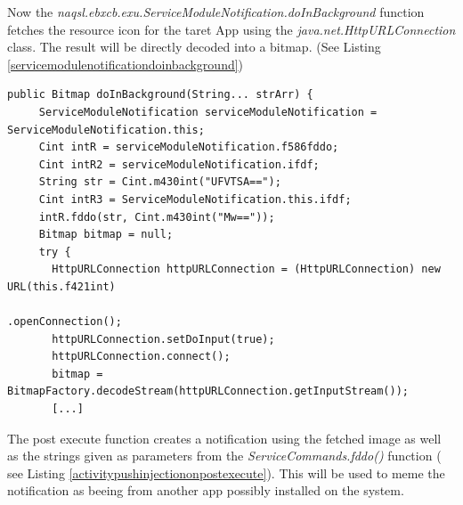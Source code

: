 \documentclass[10pt,titlepage]{article}
\begin{document}
Now the \textit{naqsl.ebxcb.exu.ServiceModuleNotification.doInBackground}
function fetches the resource icon for the taret App using the \textit{java.net.HttpURLConnection} class. The result will be directly decoded into a bitmap. (See Listing \ref{servicemodulenotificationdoinbackground})

\begin{lstlisting}[label=servicemodulenotificationdoinbackground,caption=The function textit{naqsl.ebxcb.exu.ServiceModuleNotification.doInBackground} fetches the Web resource and decodes it as bitmap.,frame=tb]
   public Bitmap doInBackground(String... strArr) {
     ServiceModuleNotification serviceModuleNotification = ServiceModuleNotification.this;
     Cint intR = serviceModuleNotification.f586fddo;
     Cint intR2 = serviceModuleNotification.ifdf;
     String str = Cint.m430int("UFVTSA==");
     Cint intR3 = ServiceModuleNotification.this.ifdf;
     intR.fddo(str, Cint.m430int("Mw=="));
     Bitmap bitmap = null;
     try {
       HttpURLConnection httpURLConnection = (HttpURLConnection) new URL(this.f421int)
                                                                      .openConnection();
       httpURLConnection.setDoInput(true);
       httpURLConnection.connect();
       bitmap = BitmapFactory.decodeStream(httpURLConnection.getInputStream());
       [...]
\end{lstlisting}
 
\newpage
The post execute function creates a notification using the fetched image as well as the strings given as parameters from the \textit{ServiceCommands.fddo()} function ( see Listing \ref{activitypushinjectiononpostexecute}). This will be used to meme the notification as beeing from another app possibly installed on the system.
\end{document}

